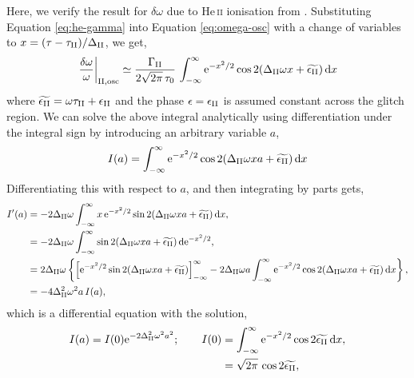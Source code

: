 Here, we verify the result for \(\delta\omega\) due to He\,\textsc{ii} ionisation from \citet{Houdek.Gough2007}. Substituting Equation \ref{eq:he-gamma} into Equation \ref{eq:omega-osc} with a change of variables to \(x = (\tau - \tau_{{\mathrm{II}}})/\Delta_{{\mathrm{II}}}\), we get,
%
\begin{equation}
    \left.\frac{\delta\omega}{\omega}\right|_{{\mathrm{II}}, \mathrm{osc}} \simeq \frac{\Gamma_{{\mathrm{II}}}}{2\sqrt{2\pi} \, \tau_0} \, \int_{-\infty}^\infty \mathrm{e}^{- x^2/2} \cos 2 (\Delta_{{\mathrm{II}}} \omega x + \widetilde{\epsilon_{{\mathrm{II}}}}) \, \mathrm{d} x \label{eq:omega-ii-osc}
\end{equation}
%
where \(\widetilde{\epsilon_{{\mathrm{II}}}} = \omega\tau_{{\mathrm{II}}} + \epsilon_{{\mathrm{II}}}\) and the phase \(\epsilon=\epsilon_{{\mathrm{II}}}\) is assumed constant across the glitch region. We can solve the above integral analytically using differentiation under the integral sign by introducing an arbitrary variable \(a\),
%
\begin{equation}
    I(a) = \int_{-\infty}^\infty \mathrm{e}^{- x^2/2 } \cos 2 (\Delta_{{\mathrm{II}}} \omega x a + \widetilde{\epsilon_{{\mathrm{II}}}}) \, \mathrm{d} x
\end{equation}
%
Differentiating this with respect to \(a\), and then integrating by parts gets,
%
\begin{align}
    I'(a) &= - 2 \Delta_{{\mathrm{II}}} \omega \int_{-\infty}^\infty x \, \mathrm{e}^{- x^2/2 } \sin 2 (\Delta_{{\mathrm{II}}} \omega x a + \widetilde{\epsilon_{{\mathrm{II}}}}) \, \mathrm{d} x, \notag\\
    &= - 2 \Delta_{{\mathrm{II}}} \omega \int_{-\infty}^\infty \sin 2 (\Delta_{{\mathrm{II}}} \omega x a + \widetilde{\epsilon_{{\mathrm{II}}}}) \, \mathrm{d} \mathrm{e}^{- x^2/2 }, \notag\\
    &= 2 \Delta_{{\mathrm{II}}} \omega \left\{ \left[ \mathrm{e}^{- x^2/2 } \sin 2 (\Delta_{{\mathrm{II}}} \omega x a + \widetilde{\epsilon_{{\mathrm{II}}}}) \right]_{-\infty}^\infty - 2 \Delta_{{\mathrm{II}}} \omega a \int_{-\infty}^\infty \mathrm{e}^{- x^2/2 } \cos 2 (\Delta_{{\mathrm{II}}} \omega x a + \widetilde{\epsilon_{{\mathrm{II}}}}) \, \mathrm{d} x \right\}, \notag\\
    &= - 4 \Delta_{{\mathrm{II}}}^2 \omega^2 a \, I(a),
\end{align}
%
which is a differential equation with the solution,
%
\begin{equation}
    \begin{split}
        I(a) = I(0) \mathrm{e}^{- 2 \Delta_{{\mathrm{II}}}^2 \omega^2 a^2}; \qquad I(0) &= \int_{-\infty}^\infty \mathrm{e}^{- x^2/2 } \cos 2 \widetilde{\epsilon_{{\mathrm{II}}}} \, \mathrm{d} x, \\
        &= \sqrt{2\pi} \, \cos 2 \widetilde{\epsilon_{{\mathrm{II}}}},
    \end{split}
\end{equation}
